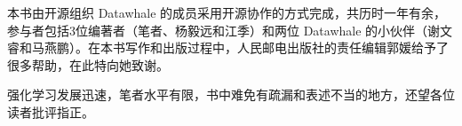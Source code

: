 \documentclass[UTF8]{ctexart}
\numberwithin{equation}{section}
\numberwithin{figure}{section}
\numberwithin{table}{section}
\begin{document}
    本书由开源组织 Datawhale 的成员采用开源协作的方式完成，共历时一年有余，参与者包括3位编著者（笔者、杨毅远和江季）和两位 Datawhale 的小伙伴（谢文睿和马燕鹏）。在本书写作和出版过程中，人民邮电出版社的责任编辑郭媛给予了很多帮助，在此特向她致谢。
        
    强化学习发展迅速，笔者水平有限，书中难免有疏漏和表述不当的地方，还望各位读者批评指正。

\rightline{\today~~~~~~~~~~}

\end{document}
